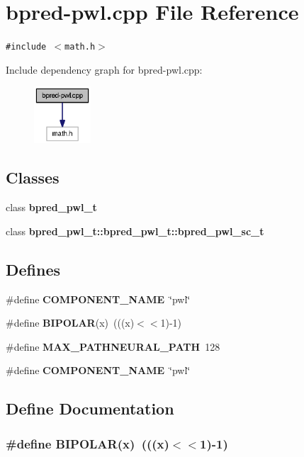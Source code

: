 \section{bpred-pwl.cpp File Reference}
\label{bpred-pwl_8cpp}
{\tt \#include $<$math.h$>$}\par


Include dependency graph for bpred-pwl.cpp:\nopagebreak
\begin{figure}[H]
\begin{center}
\leavevmode
\includegraphics[width=60pt]{bpred-pwl_8cpp__incl}
\end{center}
\end{figure}
\subsection*{Classes}
\begin{CompactItemize}
\item 
class {\bf bpred\_\-pwl\_\-t}
\item 
class {\bf bpred\_\-pwl\_\-t::bpred\_\-pwl\_\-t::bpred\_\-pwl\_\-sc\_\-t}
\end{CompactItemize}
\subsection*{Defines}
\begin{CompactItemize}
\item 
\#define {\bf COMPONENT\_\-NAME}~\char`\"{}pwl\char`\"{}
\item 
\#define {\bf BIPOLAR}(x)~(((x)$<$$<$1)-1)
\item 
\#define {\bf MAX\_\-PATHNEURAL\_\-PATH}~128
\item 
\#define {\bf COMPONENT\_\-NAME}~\char`\"{}pwl\char`\"{}
\end{CompactItemize}


\subsection{Define Documentation}
\subsubsection[{BIPOLAR}]{\setlength{\rightskip}{0pt plus 5cm}\#define BIPOLAR(x)~(((x)$<$$<$1)-1)}\label{bpred-pwl_8cpp_d1289ccac63a964f638d03575fed7697}




